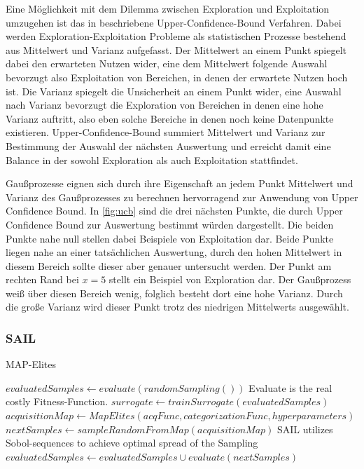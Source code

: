 Eine Möglichkeit mit dem Dilemma zwischen Exploration und Exploitation umzugehen ist das in \cite{Auer.2002} beschriebene Upper-Confidence-Bound Verfahren. Dabei werden Exploration-Exploitation Probleme als statistischen Prozesse bestehend aus Mittelwert und Varianz aufgefasst.
Der Mittelwert an einem Punkt spiegelt dabei den erwarteten Nutzen wider, eine dem Mittelwert folgende Auswahl bevorzugt also Exploitation von Bereichen, in denen der erwartete Nutzen hoch ist.
Die Varianz spiegelt die Unsicherheit an einem Punkt wider, eine Auswahl nach Varianz bevorzugt die Exploration von Bereichen in denen eine hohe Varianz auftritt, also eben solche Bereiche in denen noch keine Datenpunkte existieren.
Upper-Confidence-Bound summiert Mittelwert und Varianz zur Bestimmung der Auswahl der nächsten Auswertung und erreicht damit eine Balance in der sowohl Exploration als auch Exploitation stattfindet.

Gaußprozesse eignen sich durch ihre Eigenschaft an jedem Punkt Mittelwert und Varianz des Gaußprozesses zu berechnen hervorragend zur Anwendung von Upper Confidence Bound.
In \cref{fig:ucb} sind die drei nächsten Punkte, die durch Upper Confidence Bound zur Auswertung bestimmt würden dargestellt.
Die beiden Punkte nahe null stellen dabei Beispiele von Exploitation dar. 
Beide Punkte liegen nahe an einer tatsächlichen Auswertung, durch den hohen Mittelwert in diesem Bereich sollte dieser aber genauer untersucht werden.
Der Punkt am rechten Rand bei $x=5$ stellt ein Beispiel von Exploration dar.
Der Gaußprozess weiß über diesen Bereich wenig, folglich besteht dort eine hohe Varianz.
Durch die große Varianz wird dieser Punkt trotz des niedrigen Mittelwerts ausgewählt.

\subsubsection{SAIL}

\begin{algorithm}
	\caption{MAP-Elites} \label{alg:sail}
	\begin{algorithmic}[1]
\State $evaluatedSamples \gets evaluate(randomSampling())$ \Comment Evaluate is the real costly Fitness-Function.
\Else
\State $surrogate \gets trainSurrogate(evaluatedSamples)$
\State $acquisitionMap \gets MapElites(acqFunc,categorizationFunc,hyperparameters)$
\State $nextSamples \gets sampleRandomFromMap(acquisitionMap)$ \Comment SAIL utilizes Sobol-sequences to achieve optimal spread of the Sampling
\State $evaluatedSamples \gets evaluatedSamples \cup evaluate(nextSamples)$
\EndIf
			\EndWhile
		\EndProcedure
	\end{algorithmic}
\end{algorithm}

